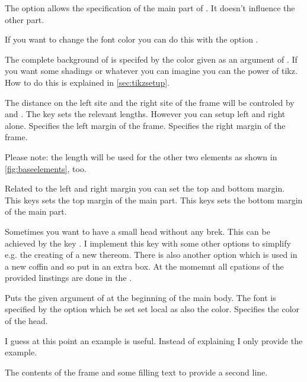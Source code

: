 \documentclass[openany,12pt,tocdepth=3]{ltx-md}
\begin{document}
The option  allows the specification of the main part of .
It doesn't influence the other part. 

If you want to change the font color you can do this with the option .

The complete background of  is specifed by the color given
as an argument of . If you want some shadings or whatever
you can imagine you can the power of tikz. How to do this
is explained in \autoref{sec:tikzsetup}.

The distance on the left site and the right site of the frame will be 
controled by  and . The 
key  sets the relevant lengths. However you can 
setup left and right alone.
Specifies the left margin of the frame.
Specifies the right margin of the frame.

\faArrowRight Please note: the length will be used for the other two elements as shown in 
\autoref{fig:baseelements}, too.

 Related to the left and right margin you can set the top and bottom margin.
This keys sets the top margin of the main part.
This keys sets the bottom margin of the main part.


Sometimes you want to have a small head without any brek. This
can be achieved by the key . I implement this key with 
some other options to simplify e.g. the creating of a new thereom. There
is also another option  which is used in a new coffin and
so put in an extra box. At the momemnt all cpations of the provided linstings
are done in the . 


Puts the given argument of  at the beginning
of the main body.
The font is specified by the option  which be set set local as
also the color.
Specifies the color of the head.


I guess at this point an example is useful. Instead of explaining I 
only provide the example.

\begin{ltxexample}[caption={Example main part},label=main,result=true]
 \begin{xframed}[%
   line-width=4pt,line-color=blue,
   inner-margin=1cm,font-color=blue!70,
   head={Example of Head},head-font-color={red!70},
   margin=1.5cm,bg-color=yellow!20,
  ]
   The contents of the frame and some filling text to 
  provide a second line.
 \end{xframed}
\end{ltxexample}
\end{document}

